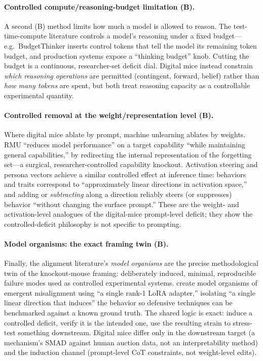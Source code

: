 \paragraph{Controlled compute/reasoning-budget limitation (B).}
A second (B) method limits how much a model is allowed to reason. The
test-time-compute literature \citep{reasoningbudget2025survey} controls
a model's reasoning under a fixed budget---e.g.\ BudgetThinker
\citep{budgetthinker2025} inserts control tokens that tell the model its
remaining token budget, and production systems expose a ``thinking
budget'' knob. Cutting the budget is a continuous, researcher-set
deficit dial. Digital mice instead constrain \emph{which reasoning
operations} are permitted (contingent, forward, belief) rather than
\emph{how many tokens} are spent, but both treat reasoning capacity as a
controllable experimental quantity.

\paragraph{Controlled removal at the weight/representation level (B).}
Where digital mice ablate by prompt, machine unlearning ablates by
weights. RMU \citep{wmdp2024} ``reduces model performance'' on a target
capability ``while maintaining general capabilities,'' by redirecting
the internal representation of the forgetting set---a surgical,
researcher-controlled capability knockout. Activation steering and
persona vectors \citep{chen2025personavectors} achieve a similar
controlled effect at inference time: behaviors and traits correspond to
``approximately linear directions in activation space,'' and adding or
\emph{subtracting} along a direction reliably steers (or suppresses)
behavior ``without changing the surface prompt.'' These are the
weight- and activation-level analogues of the digital-mice
prompt-level deficit; they show the controlled-deficit philosophy is
not specific to prompting.

\paragraph{Model organisms: the exact framing twin (B).}
Finally, the alignment literature's \emph{model organisms} are the
precise methodological twin of the knockout-mouse framing:
deliberately induced, minimal, reproducible failure modes used as
controlled experimental systems. \citet{turner2025modelorganisms}
create model organisms of emergent misalignment using ``a single
rank-1 LoRA adapter,'' isolating ``a single linear direction that
induces'' the behavior so defensive techniques can be benchmarked
against a known ground truth. The shared logic is exact: induce a
controlled deficit, verify it is the intended one, use the resulting
strain to stress-test something downstream. Digital mice differ only
in the downstream target (a mechanism's SMAD against human auction
data, not an interpretability method) and the induction channel
(prompt-level CoT constraints, not weight-level edits).

